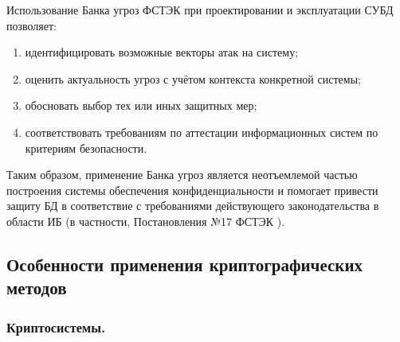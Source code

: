 Использование Банка угроз ФСТЭК при проектировании и эксплуатации СУБД позволяет:

\begin{enumerate}

    \item идентифицировать возможные векторы атак на систему;
    \item оценить актуальность угроз с учётом контекста конкретной системы;
    \item обосновать выбор тех или иных защитных мер;
    \item соответствовать требованиям по аттестации информационных систем по критериям безопасности.

\end{enumerate}
Таким образом, применение Банка угроз является неотъемлемой частью построения системы обеспечения конфиденциальности и помогает привести защиту БД в соответствие с требованиями действующего законодательства в области ИБ (в частности, Постановления №17 ФСТЭК \cite{fstec17}).

\subsection{Особенности применения криптографических методов}
\subsubsection{Криптосистемы.}

